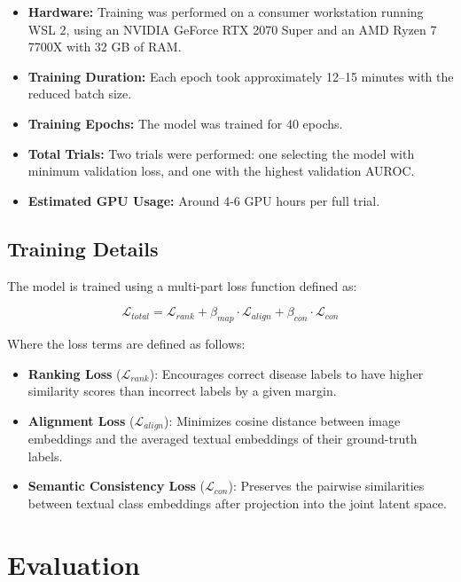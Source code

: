\documentclass[letterpaper]{article} %
\begin{document}
\begin{itemize}
    \item \textbf{Hardware:} Training was performed on a consumer workstation running WSL 2, using an NVIDIA GeForce RTX 2070 Super and an AMD Ryzen 7 7700X with 32 GB of RAM.
    \item \textbf{Training Duration:} Each epoch took approximately 12–15 minutes with the reduced batch size.
    \item \textbf{Training Epochs:} The model was trained for 40 epochs.
    \item \textbf{Total Trials:} Two trials were performed: one selecting the model with minimum validation loss, and one with the highest validation AUROC.
    \item \textbf{Estimated GPU Usage:} Around 4-6 GPU hours per full trial.
\end{itemize}

\subsection{Training Details}

The model is trained using a multi-part loss function defined as:

\begin{equation}
\mathcal{L}_{total} = \mathcal{L}_{rank} + \beta_{map} \cdot \mathcal{L}_{align} + \beta_{con} \cdot \mathcal{L}_{con}
\end{equation}

Where the loss terms are defined as follows:

\begin{itemize}
    \item \textbf{Ranking Loss} ($\mathcal{L}_{rank}$): Encourages correct disease labels to have higher similarity scores than incorrect labels by a given margin.
    \item \textbf{Alignment Loss} ($\mathcal{L}_{align}$): Minimizes cosine distance between image embeddings and the averaged textual embeddings of their ground-truth labels.
    \item \textbf{Semantic Consistency Loss} ($\mathcal{L}_{con}$): Preserves the pairwise similarities between textual class embeddings after projection into the joint latent space.
\end{itemize}

\section{Evaluation}
\end{document}
